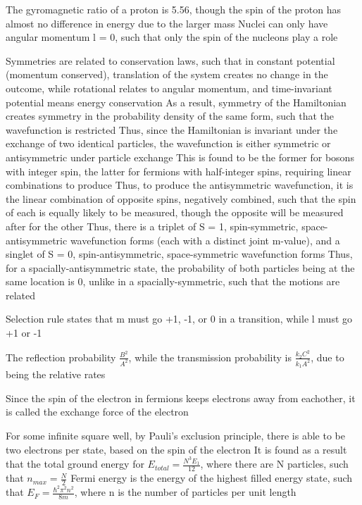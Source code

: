 \documentclass[11 pt, twoside]{article}
\newenvironment{outline*}
{
	\begin{outline}[enumerate]
	}
	{\end{outline}
}
\begin{document}
\begin{outline*}
\1 The gyromagnetic ratio of a proton is 5.56, though the spin of the proton has almost no difference in energy due to the larger mass
	\2 Nuclei can only have angular momentum l = 0, such that only the spin of the nucleons play a role

\1 Symmetries are related to conservation laws, such that in constant potential (momentum conserved), translation of the system creates no change in the outcome, while rotational relates to angular momentum, and time-invariant potential means energy conservation
	\2 As a result, symmetry of the Hamiltonian creates symmetry in the probability density of the same form, such that the wavefunction is restricted
	\2 Thus, since the Hamiltonian is invariant under the exchange of two identical particles, the wavefunction is either symmetric or antisymmetric under particle exchange
		\3 This is found to be the former for bosons with integer spin, the latter for fermions with half-integer spins, requiring linear combinations to produce
		\3 Thus, to produce the antisymmetric wavefunction, it is the linear combination of opposite spins, negatively combined, such that the spin of each is equally likely to be measured, though the opposite will be measured after for the other
	\2 Thus, there is a triplet of S = 1, spin-symmetric, space-antisymmetric wavefunction forms (each with a distinct joint m-value), and a singlet of S = 0, spin-antisymmetric, space-symmetric wavefunction forms
		\3 Thus, for a spacially-antisymmetric state, the probability of both particles being at the same location is 0, unlike in a spacially-symmetric, such that the motions are related

\1 Selection rule states that m must go +1, -1, or 0 in a transition, while l must go +1 or -1

\1 The reflection probability $\frac{B^2}{A^2}$, while the transmission probability is $\frac{k_2 C^2}{k_1 A^2}$, due to being the relative rates

\1 Since the spin of the electron in fermions keeps electrons away from eachother, it is called the exchange force of the electron

\1 For some infinite square well, by Pauli's exclusion principle, there is able to be two electrons per state, based on the spin of the electron
	\2 It is found as a result that the total ground energy for $E_{total} = \frac{N^3E_1}{12}$, where there are N particles, such that $n_{max} = \frac{N}{2}$
	\2 Fermi energy is the energy of the highest filled energy state, such that $E_F = \frac{\hbar^2 \pi^2 n^2}{8m}$, where n is the number of particles per unit length


\end{outline*}
\end{document}
